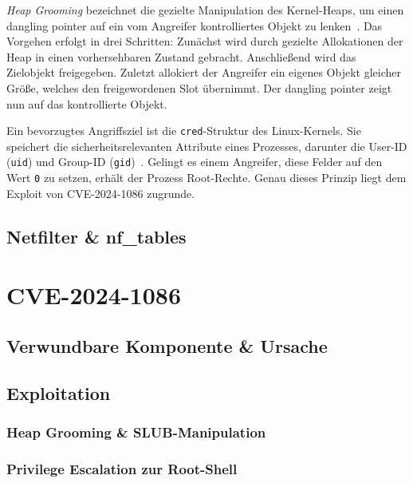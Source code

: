 \documentclass[12pt]{article}
\begin{document}
\textit{Heap Grooming} bezeichnet die gezielte Manipulation des Kernel-Heaps, 
um einen dangling pointer auf ein vom Angreifer kontrolliertes Objekt zu 
lenken~\cite{hawkes2008}. Das Vorgehen erfolgt in drei Schritten: Zunächst 
wird durch gezielte Allokationen der Heap in einen vorhersehbaren Zustand 
gebracht. Anschließend wird das Zielobjekt freigegeben. Zuletzt allokiert 
der Angreifer ein eigenes Objekt gleicher Größe, welches den freigewordenen 
Slot übernimmt. Der dangling pointer zeigt nun auf das kontrollierte Objekt.

Ein bevorzugtes Angriffsziel ist die \texttt{cred}-Struktur des Linux-Kernels. 
Sie speichert die sicherheitsrelevanten Attribute eines Prozesses, darunter 
die User-ID (\texttt{uid}) und Group-ID (\texttt{gid})~\cite{kernel_cred}. 
Gelingt es einem Angreifer, diese Felder auf den Wert \texttt{0} zu setzen, 
erhält der Prozess Root-Rechte. Genau dieses Prinzip liegt dem 
Exploit von CVE-2024-1086 zugrunde.
	\subsection{Netfilter \& nf\_tables}

\section{CVE-2024-1086}
  \subsection{Verwundbare Komponente \& Ursache}
  \subsection{Exploitation}
    \subsubsection{Heap Grooming \& SLUB-Manipulation}
    \subsubsection{Privilege Escalation zur Root-Shell}
\end{document}
